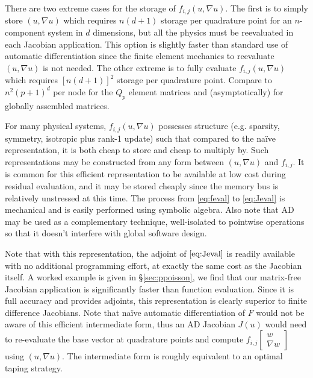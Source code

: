 There are two extreme cases for the storage of $f_{i,j}(u,\nabla u)$.  The first is to simply store $(u,\nabla u)$ which
requires $n(d+1)$ storage per quadrature point for an $n$-component system in $d$ dimensions, but all the physics must
be reevaluated in each Jacobian application.  This option is slightly faster than standard use of automatic
differentiation since the finite element mechanics to reevaluate $(u,\nabla u)$ is not needed.  The other extreme is to
fully evaluate $f_{i,j}(u,\nabla u)$ which requires $[n(d+1)]^2$ storage per quadrature point.  Compare to
$n^2(p+1)^{d}$ per node for the $Q_p$ element matrices and (asymptotically) for globally assembled matrices.

For many physical systems, $f_{i,j}(u,\nabla u)$ possesses structure (e.g. sparsity, symmetry, isotropic plus rank-1
update) such that compared to the na\"ive representation, it is both cheap to store and cheap to multiply by.  Such
representations may be constructed from any form between $(u,\nabla u)$ and $f_{i,j}$.  It is common for this efficient
representation to be available at low cost during residual evaluation, and it may be stored cheaply since the memory bus
is relatively unstressed at this time.  The process from \eqref{eq:feval} to \eqref{eq:Jeval} is mechanical and is
easily performed using symbolic algebra.  Also note that AD may be used as a complementary technique, well-isolated to
pointwise operations so that it doesn't interfere with global software design.

Note that with this representation, the adjoint of $\eqref{eq:Jeval}$ is readily available with no additional
programming effort, at exactly the same cost as the Jacobian itself.  A worked example is given in \S\ref{sec:ppoisson},
we find that our matrix-free Jacobian application is significantly faster than function evaluation.  Since it is full
accuracy and provides adjoints, this representation is clearly superior to finite difference Jacobians.  Note that
na\"ive automatic differentiation of $F$ would not be aware of this efficient intermediate form, thus an AD Jacobian
$J(u)$ would need to re-evaluate the base vector at quadrature points and compute $f_{i,j}\left[\begin{smallmatrix}w \\
    \nabla w\end{smallmatrix}\right]$ using $(u,\nabla u)$.  The intermediate form is roughly equivalent to an optimal
taping strategy.

